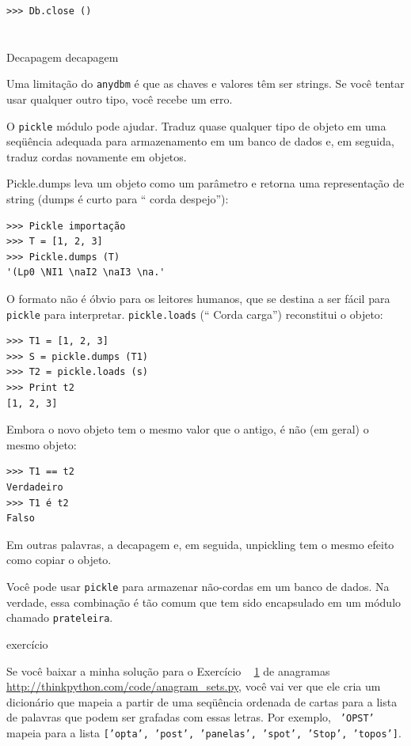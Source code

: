 \documentclass[10pt]{book}
\begin{document}
\begin{v erbatim}
\begin{verbatim}
>>> Db.close ()
\end{verbatim}
%


\section{} Decapagem
\index{} decapagem

Uma limitação do {\tt anydbm} é que as chaves e valores têm
ser strings. Se você tentar usar qualquer outro tipo, você recebe um
erro.

O {\tt pickle} módulo pode ajudar. Traduz
quase qualquer tipo de objeto em uma seqüência adequada para armazenamento em um
banco de dados e, em seguida, traduz cordas novamente em objetos.

{Pickle.dumps \tt} leva um objeto como um parâmetro e retorna
uma representação de string ({dumps \tt} é curto para `` corda despejo''):

\begin{verbatim}
>>> Pickle importação
>>> T = [1, 2, 3]
>>> Pickle.dumps (T)
'(Lp0 \NI1 \naI2 \naI3 \na.'
\end{verbatim}
%
O formato não é óbvio para os leitores humanos, que se destina a ser
fácil para {\tt pickle} para interpretar. {\tt pickle.loads}
(`` Corda carga'') reconstitui o objeto:

\begin{verbatim}
>>> T1 = [1, 2, 3]
>>> S = pickle.dumps (T1)
>>> T2 = pickle.loads (s)
>>> Print t2
[1, 2, 3]
\end{verbatim}
%
Embora o novo objeto tem o mesmo valor que o antigo, é
não (em geral) o mesmo objeto:

\begin{verbatim}
>>> T1 == t2
Verdadeiro
>>> T1 é t2
Falso
\end{verbatim}
%
Em outras palavras, a decapagem e, em seguida, unpickling tem o mesmo efeito
como copiar o objeto.

Você pode usar {\tt pickle} para armazenar não-cordas em um banco de dados.
Na verdade, essa combinação é tão comum que tem sido
encapsulado em um módulo chamado {\tt prateleira}.  


\begin{} exercício

Se você baixar a minha solução para o Exercício ~ \ref {} de anagramas
\url{http://thinkpython.com/code/anagram_sets.py}, você vai ver que ele cria
um dicionário que mapeia a partir de uma seqüência ordenada de cartas para a lista de
palavras que podem ser grafadas com essas letras. Por exemplo, {\tt
  'OPST'} mapeia para a lista {\tt ['opta', 'post', 'panelas', 'spot',
    'Stop', 'topos']}.


\end{}
\end{v erbatim}
\end{document}

